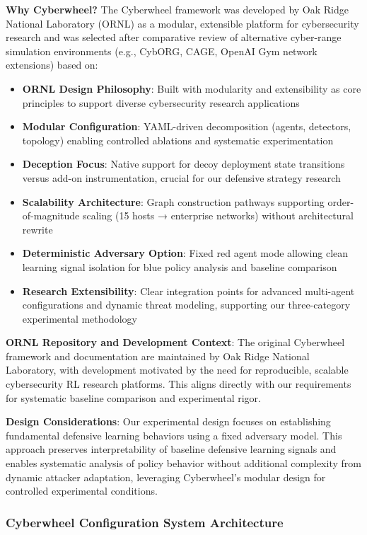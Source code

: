 \documentclass[12pt,oneside,a4paper]{article}
\theoremstyle{definition}
\theoremstyle{plain}
\begin{document}
\textbf{Why Cyberwheel?} The Cyberwheel framework was developed by Oak Ridge National Laboratory (ORNL) as a modular, extensible platform for cybersecurity research and was selected after comparative review of alternative cyber-range simulation environments (e.g., CybORG, CAGE, OpenAI Gym network extensions) based on:
\begin{itemize}
    \item \textbf{ORNL Design Philosophy}: Built with modularity and extensibility as core principles to support diverse cybersecurity research applications
    \item \textbf{Modular Configuration}: YAML-driven decomposition (agents, detectors, topology) enabling controlled ablations and systematic experimentation
    \item \textbf{Deception Focus}: Native support for decoy deployment state transitions versus add-on instrumentation, crucial for our defensive strategy research
    \item \textbf{Scalability Architecture}: Graph construction pathways supporting order-of-magnitude scaling (15 hosts → enterprise networks) without architectural rewrite
    \item \textbf{Deterministic Adversary Option}: Fixed red agent mode allowing clean learning signal isolation for blue policy analysis and baseline comparison
    \item \textbf{Research Extensibility}: Clear integration points for advanced multi-agent configurations and dynamic threat modeling, supporting our three-category experimental methodology
\end{itemize}

\textbf{ORNL Repository and Development Context}: The original Cyberwheel framework and documentation are maintained by Oak Ridge National Laboratory, with development motivated by the need for reproducible, scalable cybersecurity RL research platforms. This aligns directly with our requirements for systematic baseline comparison and experimental rigor.

\textbf{Design Considerations}: Our experimental design focuses on establishing fundamental defensive learning behaviors using a fixed adversary model. This approach preserves interpretability of baseline defensive learning signals and enables systematic analysis of policy behavior without additional complexity from dynamic attacker adaptation, leveraging Cyberwheel's modular design for controlled experimental conditions.

\subsubsection{Cyberwheel Configuration System Architecture}
\end{document}
